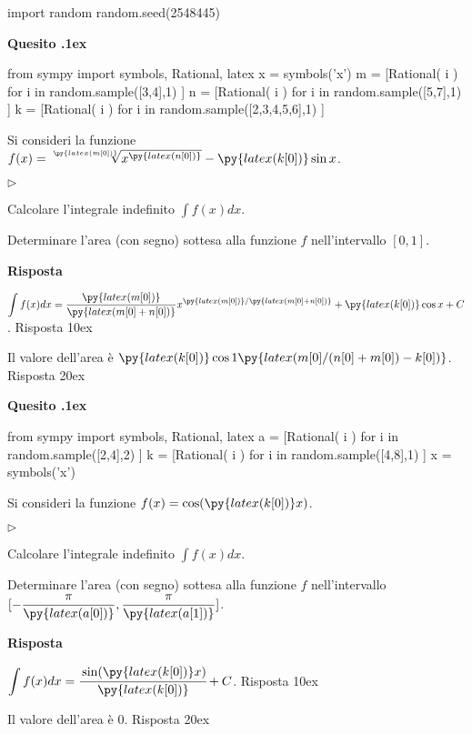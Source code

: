 \documentclass[11pt,twoside,a4paper]{article}
\newcommand{\mylabel}[1]{#1\hfill}
\renewenvironment{itemize}
  {\begin{list}{$\triangleright$}{%
   \setlength{\parskip}{0mm}
   \setlength{\topsep}{.4\baselineskip}
   \setlength{\rightmargin}{0mm}
   \setlength{\listparindent}{0mm}
   \setlength{\itemindent}{0mm}
   \setlength{\labelwidth}{2ex}
   \setlength{\itemsep}{.4\baselineskip}
   \setlength{\parsep}{0mm}
   \setlength{\partopsep}{0mm}
   \setlength{\labelsep}{1ex}
   \setlength{\leftmargin}{\labelwidth+\labelsep}
   \let\makelabel\mylabel}}{%
   \end{list}\vspace*{-1.3mm}}
\newcounter{quesito}
\newenvironment{question}{\bigskip\addtocounter{quesito}{1}\bigskip\bigskip\par\textbf{Quesito \thequesito.\kern1ex}}{\vspace{\parskip}}
\newenvironment{answer}{\par\textbf{Risposta\quad}}{\vspace{\parskip}}
\begin{document}
\begin{pycode}
import random
random.seed(2548445)
\end{pycode}
\begin{question}
\begin{pycode}
from sympy import symbols, Rational, latex
x = symbols('x')
m = [Rational( i ) for i in random.sample([3,4],1) ]
n = [Rational( i ) for i in random.sample([5,7],1) ]
k = [Rational( i ) for i in random.sample([2,3,4,5,6],1) ]
\end{pycode}
Si consideri la funzione $f(x) = \sqrt[\py{latex(m[0])}]{x^{\py{latex(n[0])}}} - \py{latex(k[0])}\sin x$.
\begin{itemize}
\item[1.] Calcolare l'integrale indefinito $\displaystyle \int f(x) dx$.
\item[2.] Determinare l'area (con segno) sottesa alla funzione $f$ nell'intervallo $[0,1]$.
\end{itemize}
\begin{answer}

{\color{blue}
$\displaystyle \int f(x) dx = \dfrac{\py{latex(m[0])}}{\py{latex(m[0]+n[0])}}x^{\py{latex(m[0])}/\py{latex(m[0]+n[0])}} + \py{latex(k[0])}\cos x + C$.
\hfill Risposta 1\kern0ex}


\medskip
{\color{blue} Il valore dell'area è
$\py{latex(k[0])}\cos 1 \py{latex(m[0]/(n[0]+m[0])-k[0])}$.
\hfill Risposta 2\kern0ex}

\end{answer}
\end{question}
\begin{question}
\begin{pycode}
from sympy import symbols, Rational, latex
a = [Rational( i ) for i in random.sample([2,4],2) ]
k = [Rational( i ) for i in random.sample([4,8],1) ]
x = symbols('x')
\end{pycode}
Si consideri la funzione $f(x) = \cos(\py{latex(k[0])}x)$.
\begin{itemize}
\item[1.] Calcolare l'integrale indefinito $\displaystyle \int f(x) dx$.
\item[2.] Determinare l'area (con segno) sottesa alla funzione $f$ nell'intervallo $[-\dfrac{\pi}{\py{latex(a[0])}},\dfrac{\pi}{\py{latex(a[1])}}]$.
\end{itemize}
\begin{answer}

{\color{blue}
$\displaystyle \int f(x) dx = \cfrac{\sin(\py{latex(k[0])}x)}{\py{latex(k[0])}} + C$.
\hfill Risposta 1\kern0ex}


\medskip
{\color{blue} Il valore dell'area è 0.
\hfill Risposta 2\kern0ex}

\end{answer}
\end{question}
\end{document}
